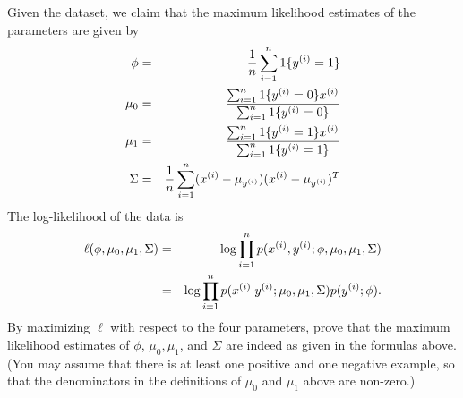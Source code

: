 \item {} Given the dataset, we claim that the maximum
  likelihood estimates of the parameters are given by
  \begin{eqnarray*}
    \phi &=& \frac{1}{{n}} \sum_{i=1}^{n} 1\{y^{(i)} = 1\} \\
\mu_{0} &=& \frac{\sum_{i=1}^{n} 1\{y^{(i)} = {0}\} x^{(i)}}{\sum_{i=1}^{n}
1\{y^{(i)} = {0}\}} \\
\mu_1 &=& \frac{\sum_{i=1}^{n} 1\{y^{(i)} = 1\} x^{(i)}}{\sum_{i=1}^{n} 1\{y^{(i)}
= 1\}} \\
\Sigma &=& \frac{1}{{n}} \sum_{i=1}^{n} (x^{(i)} - \mu_{y^{(i)}}) (x^{(i)} -
\mu_{y^{(i)}})^T
  \end{eqnarray*}
  The log-likelihood of the data is
  \begin{eqnarray*}
\ell(\phi, \mu_{0}, \mu_1, \Sigma) &=& \log \prod_{i=1}^{n} p(x^{(i)} , y^{(i)};
\phi, \mu_{0}, \mu_1, \Sigma) \\
&=& \log \prod_{i=1}^{n} p(x^{(i)} | y^{(i)}; \mu_{0}, \mu_1, \Sigma) p(y^{(i)};
\phi).
  \end{eqnarray*}
By maximizing $\ell$ with respect to the four parameters,
prove that the maximum likelihood estimates of $\phi$, $\mu_{0}, \mu_1$, and
$\Sigma$ are indeed as given in the formulas above.  (You may assume that there
is at least one positive and one negative example, so that the denominators in
the definitions of $\mu_{0}$ and $\mu_1$ above are non-zero.)

